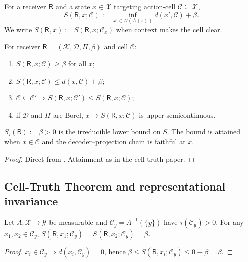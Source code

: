 \documentclass[11pt,twocolumn,a4paper]{article}
\newcommand{\K}{\mathcal{K}}
\newcommand{\D}{\mathcal{D}}
\newcommand{\X}{\mathcal{X}}
\newcommand{\Y}{\mathcal{Y}}
\newcommand{\Cell}{\mathcal{C}}
\newcommand{\receiver}{\mathsf{R}}
\newcommand{\Sfloor}{S_{\flat}}
\begin{document}
\begin{definition}[$S$-functional]\label{def:S}
For a receiver $\receiver$ and a state $x\in\X$ targeting action-cell
$\Cell\subseteq\X$,
\[
S(\receiver,x;\Cell):=\inf_{x'\in\Pi(\D(x))}d(x',\Cell)+\beta.
\]
We write $S(\receiver,x):=S(\receiver,x;\Cell_x)$ when context makes
the cell clear.
\end{definition}

\begin{proposition}\label{prop:basic-S}
For receiver $\receiver=(\K,\D,\Pi,\beta)$ and cell $\Cell$:
\begin{enumerate}[label=(\arabic*),leftmargin=*]
\item $S(\receiver,x;\Cell)\ge\beta$ for all $x$;
\item $S(\receiver,x;\Cell)\le d(x,\Cell)+\beta$;
\item $\Cell\subseteq\Cell'\Rightarrow S(\receiver,x;\Cell')\le
S(\receiver,x;\Cell)$;
\item if $\D$ and $\Pi$ are Borel, $x\mapsto S(\receiver,x;\Cell)$ is
upper semicontinuous.
\end{enumerate}
\end{proposition}

\begin{theorem}\label{thm:floor}
$\Sfloor(\receiver):=\beta>0$ is the irreducible lower bound on $S$.
The bound is attained when $x\in\Cell$ and the decoder--projection
chain is faithful at $x$.
\end{theorem}

\begin{proof}
Direct from . Attainment as in the cell-truth paper.
\end{proof}

\subsection{Cell-Truth Theorem and representational invariance}

\begin{theorem}\label{thm:cell-truth}
Let $A:\X\to\Y$ be measurable and $\Cell_y=A^{-1}(\{y\})$ have
$\tau(\Cell_y)>0$. For any $x_1,x_2\in\Cell_y$,
$S(\receiver,x_1;\Cell_y)=S(\receiver,x_2;\Cell_y)=\beta$.
\end{theorem}

\begin{proof}
$x_i\in\Cell_y\Rightarrow d(x_i,\Cell_y)=0$, hence
$\beta\le S(\receiver,x_i;\Cell_y)\le 0+\beta=\beta$.
\end{proof}
\end{document}
